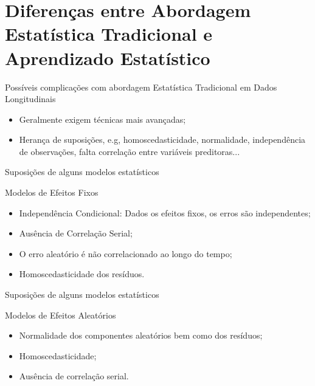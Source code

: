 \section{Diferenças entre Abordagem Estatística Tradicional e Aprendizado Estatístico}

\begin{frame}{Possíveis complicações com abordagem Estatística Tradicional em Dados Longitudinais}
    \begin{block}{}
        \begin{itemize}
            \item Geralmente exigem técnicas mais avançadas;
            \item Herança de suposições, e.g, homoscedasticidade, normalidade, independência de observações, falta correlação entre variáveis preditoras...
        \end{itemize}
    \end{block}
\end{frame}

\begin{frame}{Suposições de alguns modelos estatísticos}
	\begin{block}{Modelos de Efeitos Fixos}
		\begin{itemize}
			\item Independência Condicional: Dados os efeitos fixos, os erros são independentes;
			\item Ausência de Correlação Serial; 
			\item O erro aleatório é não correlacionado ao longo do tempo;
			\item Homoscedasticidade dos resíduos.
		\end{itemize}
	\end{block}
\end{frame}

\begin{frame}{Suposições de alguns modelos estatísticos}
	\begin{block}{Modelos de Efeitos Aleatórios}
		\begin{itemize}
			\item Normalidade dos componentes aleatórios bem como dos resíduos;
			\item Homoscedasticidade; 
			\item Ausência de correlação serial.
		\end{itemize}
	\end{block}
\end{frame}

